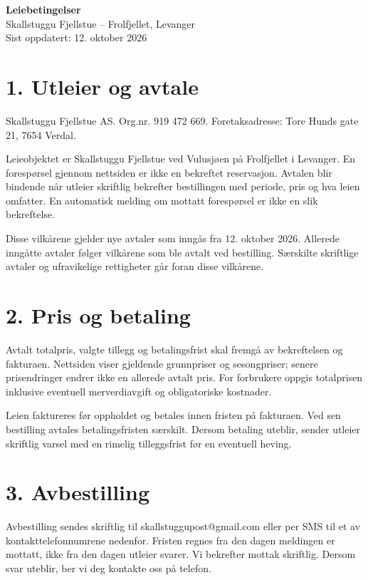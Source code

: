 \documentclass[12pt,a4paper]{article}
\begin{document}
\begin{center}
{\LARGE\textbf{Leiebetingelser}}\\[6pt]
{\large Skallstuggu Fjellstue -- Frolfjellet, Levanger}\\[6pt]
\small Sist oppdatert: 12. oktober 2026
\end{center}

\section{1. Utleier og avtale}
Skallstuggu Fjellstue AS. Org.nr. 919 472 669. Foretaksadresse: Tore Hunds gate 21, 7654 Verdal.

Leieobjektet er Skallstuggu Fjellstue ved Vulusjøen på Frolfjellet i Levanger. En forespørsel gjennom nettsiden er ikke en bekreftet reservasjon. Avtalen blir bindende når utleier skriftlig bekrefter bestillingen med periode, pris og hva leien omfatter. En automatisk melding om mottatt forespørsel er ikke en slik bekreftelse.

Disse vilkårene gjelder nye avtaler som inngås fra 12. oktober 2026. Allerede inngåtte avtaler følger vilkårene som ble avtalt ved bestilling. Særskilte skriftlige avtaler og ufravikelige rettigheter går foran disse vilkårene.


\section{2. Pris og betaling}
Avtalt totalpris, valgte tillegg og betalingsfrist skal fremgå av bekreftelsen og fakturaen. Nettsiden viser gjeldende grunnpriser og sesongpriser; senere prisendringer endrer ikke en allerede avtalt pris. For forbrukere oppgis totalprisen inklusive eventuell merverdiavgift og obligatoriske kostnader.

Leien faktureres før oppholdet og betales innen fristen på fakturaen. Ved sen bestilling avtales betalingsfristen særskilt. Dersom betaling uteblir, sender utleier skriftlig varsel med en rimelig tilleggsfrist før en eventuell heving.


\section{3. Avbestilling}
Avbestilling sendes skriftlig til skallstuggupost@gmail.com eller per SMS til et av kontakttelefonnumrene nedenfor. Fristen regnes fra den dagen meldingen er mottatt, ikke fra den dagen utleier svarer. Vi bekrefter mottak skriftlig. Dersom svar uteblir, ber vi deg kontakte oss på telefon.
\end{document}
